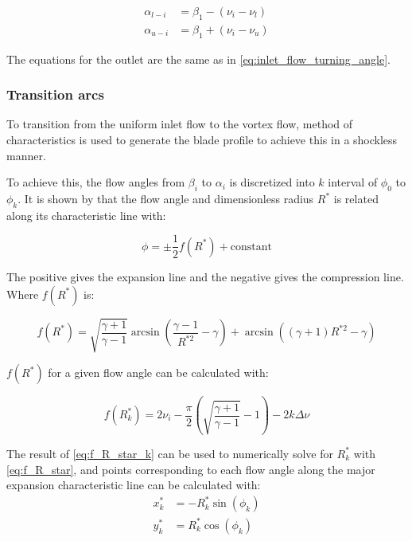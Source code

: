 \begin{equation}
\begin{aligned}
    \alpha_{l-i} & = \beta_1 - (\nu_i - \nu_l) \\
    \alpha_{u-i} & = \beta_1 + (\nu_i - \nu_u)
\end{aligned}
\label{eq:inlet_flow_turning_angle}
\end{equation}

The equations for the outlet are the same as in \cref{eq:inlet_flow_turning_angle}.

\subsubsection{Transition arcs}

To transition from the uniform inlet flow to the vortex flow, method of characteristics is used to generate the blade profile to achieve this in a shockless manner. 


To achieve this, the flow angles from $\beta_i$ to $\alpha_i$ is discretized into $k$ interval of $\phi_0$ to $\phi_k$. It is shown by \cite{find the ref from goldman 1968 ref 2} that the flow angle and dimensionless radius $R^*$ is related along its characteristic line with:

\begin{equation}
    \phi = \pm \frac{1}{2}f(R^*) + \textrm{constant}
    \label{eq:characteristic_line_equation}
\end{equation}

The positive gives the expansion line and the negative gives the compression line. Where $f(R^*)$ is:

\begin{equation}
    f(R^*) = \sqrt{\frac{\gamma + 1}{\gamma - 1}}\arcsin\left(\frac{\gamma-1}{R^{*2}} - \gamma\right) + \arcsin\left(\left(\gamma+1\right)R^{*2} - \gamma\right)
    \label{eq:f_R_star}
\end{equation}

$f(R^*)$ for a given flow angle can be calculated with:

\begin{equation}
    f(R^*_k) = 2\nu_i - \frac{\pi}{2}\left(\sqrt{\frac{\gamma+1}{\gamma-1}} - 1\right) - 2k\Delta\nu
    \label{eq:f_R_star_k}
\end{equation}

The result of \cref{eq:f_R_star_k} can be used to numerically solve for $R^*_k$ with \cref{eq:f_R_star}, and points corresponding to each flow angle along the major expansion characteristic line can be calculated with:
\begin{equation}
    \begin{aligned}
    x^*_{k} & = -R^*_k \sin(\phi_k) \\
    y^*_{k} & = R^*_k \cos(\phi_k)
    \end{aligned}
\end{equation}


